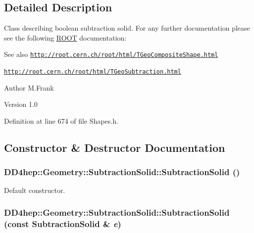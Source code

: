 \subsection{Detailed Description}
Class describing boolean subtraction solid. For any further documentation please see the following \hyperlink{namespace_r_o_o_t}{ROOT} documentation: \begin{DoxySeeAlso}{See also}
\href{http://root.cern.ch/root/html/TGeoCompositeShape.html}{\tt http://root.cern.ch/root/html/TGeoCompositeShape.html} 

\href{http://root.cern.ch/root/html/TGeoSubtraction.html}{\tt http://root.cern.ch/root/html/TGeoSubtraction.html}
\end{DoxySeeAlso}
\begin{DoxyAuthor}{Author}
M.Frank 
\end{DoxyAuthor}
\begin{DoxyVersion}{Version}
1.0 
\end{DoxyVersion}


Definition at line 674 of file Shapes.h.

\subsection{Constructor \& Destructor Documentation}
\hypertarget{class_d_d4hep_1_1_geometry_1_1_subtraction_solid_aa659d040bc5720bcc3a967508ce2c203}{
\subsubsection[{SubtractionSolid}]{\setlength{\rightskip}{0pt plus 5cm}DD4hep::Geometry::SubtractionSolid::SubtractionSolid ()}}
\label{class_d_d4hep_1_1_geometry_1_1_subtraction_solid_aa659d040bc5720bcc3a967508ce2c203}


Default constructor. \hypertarget{class_d_d4hep_1_1_geometry_1_1_subtraction_solid_af79b5d4942ce415ed319dfb29bd58c47}{
\subsubsection[{SubtractionSolid}]{\setlength{\rightskip}{0pt plus 5cm}DD4hep::Geometry::SubtractionSolid::SubtractionSolid (const {\bf SubtractionSolid} \& {\em e})}}
\label{class_d_d4hep_1_1_geometry_1_1_subtraction_solid_af79b5d4942ce415ed319dfb29bd58c47}


